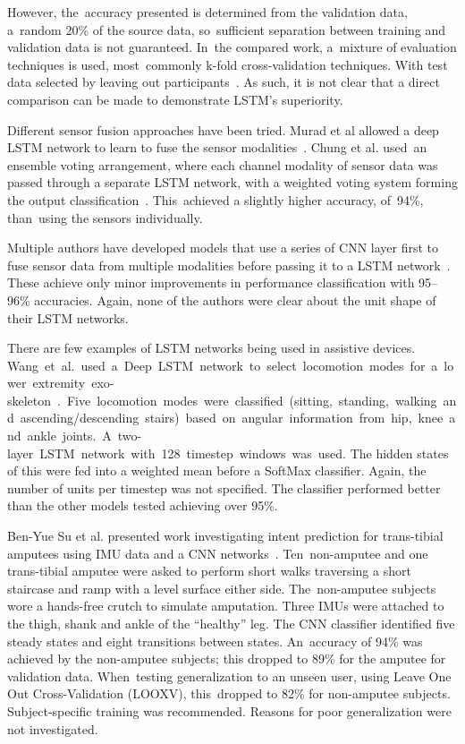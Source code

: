 However, the~accuracy presented is determined from the validation data, a~random 20\% of the source data, so~sufficient separation between training and validation data is not guaranteed. In~the compared work, a~mixture of evaluation techniques is used, most~commonly k-fold cross-validation techniques. With test data selected by leaving out participants~\cite{Koller2018, Sprager2015}. As such, it is not clear that a direct comparison can be made to demonstrate LSTM's superiority.

Different sensor fusion approaches have been tried. Murad et al allowed a deep LSTM network to learn to fuse the sensor modalities~\cite{Murad2017}. Chung et al. used~an ensemble voting arrangement, where each channel modality of sensor data was passed through a separate LSTM network, with a weighted voting system forming the output classification~\cite{Chung2019}. This~achieved a slightly higher accuracy, of~94\%, than~using the sensors individually.

Multiple authors have developed models that use a series of CNN layer first to fuse sensor data from multiple modalities before passing it to a LSTM network~\cite{Abbaspour2020, Ihianle2020, Mutegeki2020, Wang2020, Mekruksavanich2020}. These achieve only minor improvements in performance classification with 95--96\% accuracies. Again, none of the authors were clear about the unit shape of their LSTM networks.

There are few examples of LSTM networks being used in assistive devices. \mbox{Wang~et al. used~a Deep LSTM network to select locomotion modes for a lower extremity exo-skeleton~\cite{Wang2018}. Five~locomotion modes were classified (sitting, standing, walking and ascending/descending stairs) based on angular information from hip, knee~and ankle joints. A two-layer LSTM network with 128 timestep windows was used.} The hidden states of this were fed into a weighted mean before a SoftMax classifier. Again, the number of units per timestep was not specified. The classifier performed better than the other models tested achieving over 95\%.

Ben-Yue Su et al. presented work investigating intent prediction for trans-tibial amputees using IMU data and a CNN networks~\cite{Su2019}. Ten~non-amputee and one trans-tibial amputee were asked to perform short walks traversing a short staircase and ramp with a level surface either side. The~non-amputee subjects wore a hands-free crutch to simulate amputation. Three IMUs were attached to the thigh, shank and ankle of the ``healthy'' leg. The CNN classifier identified five steady states and eight transitions between states. An~accuracy of 94\% was achieved by the non-amputee subjects; this dropped to 89\% for the amputee for validation data. When~testing generalization to an unseen user, using Leave One Out Cross-Validation (LOOXV), this~dropped to 82\% for non-amputee subjects. Subject-specific training was recommended. Reasons for poor generalization were not investigated.

